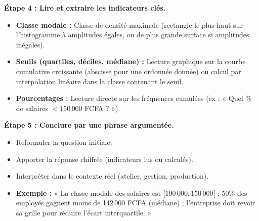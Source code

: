\documentclass[11pt]{article}
\begin{document}
\begin{methode}
\textbf{Étape 4 : Lire et extraire les indicateurs clés.}
\begin{itemize}
    \item \textbf{Classe modale :} Classe de densité maximale (rectangle le plus haut sur l'histogramme à amplitudes égales, ou de plus grande surface si amplitudes inégales).
    \item \textbf{Seuils (quartiles, déciles, médiane) :} Lecture graphique sur la courbe cumulative croissante (abscisse pour une ordonnée donnée) ou calcul par interpolation linéaire dans la classe contenant le seuil.
    \item \textbf{Pourcentages :} Lecture directe sur les fréquences cumulées (ex : « Quel \% de salaires $< 150\,000$ FCFA ? »).
\end{itemize}

\textbf{Étape 5 : Conclure par une phrase argumentée.}
\begin{itemize}
    \item Reformuler la question initiale.
    \item Apporter la réponse chiffrée (indicateurs lus ou calculés).
    \item Interpréter dans le contexte réel (atelier, gestion, production).
    \item \textbf{Exemple :} « La classe modale des salaires est $[100\,000 ; 150\,000[$ ; 50\% des employés gagnent moins de 142\,000 FCFA (médiane) ; l'entreprise doit revoir sa grille pour réduire l'écart interquartile. »
\end{itemize}
\end{methode}
\end{document}
